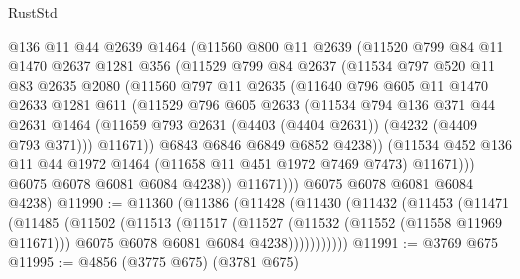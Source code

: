 \begin{lexlean}{RustStd}
\begin{coremodule}
            @136
            @11
            @44
            @2639
            @1464
            (@11560
              @800
              @11
              @2639
              (@11520
                @799
                @84
                @11
                @1470
                @2637
                @1281
                @356
                (@11529
                  @799
                  @84
                  @2637
                  (@11534
                    @797
                    @520
                    @11
                    @83
                    @2635
                    @2080
                    (@11560
                      @797
                      @11
                      @2635
                      (@11640
                        @796
                        @605
                        @11
                        @1470
                        @2633
                        @1281
                        @611
                        (@11529
                          @796
                          @605
                          @2633
                          (@11534
                            @794
                            @136
                            @371
                            @44
                            @2631
                            @1464
                            (@11659 @793 @2631 (@4403 (@4404 @2631)) (@4232 (@4409 @793 @371)))
                            @11671))
                        @6843
                        @6846
                        @6849
                        @6852
                        @4238))
                    (@11534
                      @452
                      @136
                      @11
                      @44
                      @1972
                      @1464
                      (@11658 @11 @451 @1972 @7469 @7473)
                      @11671)))
                @6075
                @6078
                @6081
                @6084
                @4238))
            @11671)))
      @6075
      @6078
      @6081
      @6084
      @4238)
@11990 := @11360
    (@11386
      (@11428
        (@11430
          (@11432
            (@11453
              (@11471
                (@11485
                  (@11502
                    (@11513
                      (@11517
                        (@11527
                          (@11532 (@11552 (@11558 @11969 @11671)))
                          @6075
                          @6078
                          @6081
                          @6084
                          @4238)))))))))))
@11991 := @3769 @675
@11995 := @4856 (@3775 @675) (@3781 @675)

\end{coremodule}
\end{lexlean}
